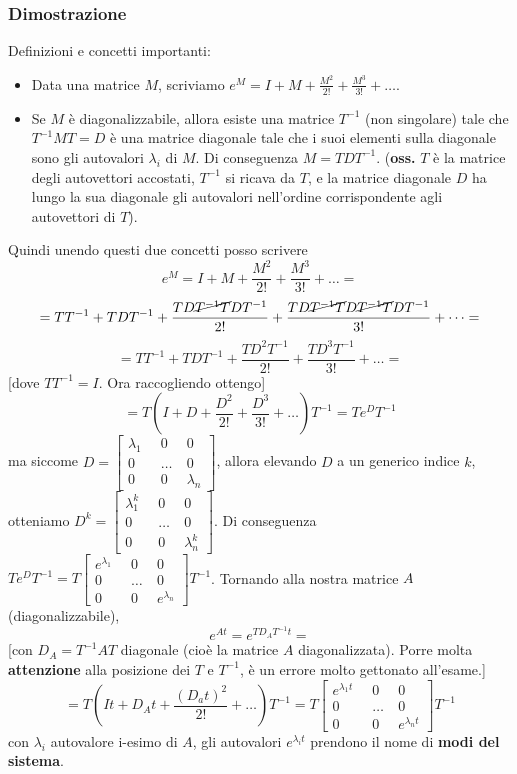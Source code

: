 \subsubsection{Dimostrazione}
Definizioni e concetti importanti:
\begin{itemize}
    \item Data una matrice $M$, scriviamo $e^M = I + M + \frac{M^2}{2!} + \frac{M^3}{3!}+\dots$.
    \item Se $M$ è diagonalizzabile, allora esiste una matrice $T^{-1}$ (non singolare) tale che $T^{-1} M T = D$ è una matrice diagonale tale che i suoi elementi sulla diagonale sono gli autovalori $\lambda_i$ di $M$. Di conseguenza $M = T D T^{-1}$.\newline
    (\textbf{oss.} $T$ è la matrice degli autovettori accostati, $T^{-1}$ si ricava da $T$, e la matrice diagonale $D$ ha lungo la sua diagonale gli autovalori nell'ordine corrispondente agli autovettori di $T$).
\end{itemize}
Quindi unendo questi due concetti posso scrivere
\[
    e^M = I + M + \frac{M^2}{2!} + \frac{M^3}{3!}+\dots=
\]
\[
    = TT^{-1} + T D T^{-1} + \frac{TD\cancel{T^{-1} T}DT^{-1}}{2!} + \frac{TD \cancel{T^{-1} T}D \cancel{T^{-1} T}DT^{-1}}{3!} + \dots =
\]
\[
    = TT^{-1} + T D T^{-1} + \frac{TD^2T^{-1}}{2!} + \frac{TD^3T^{-1}}{3!} + \dots=
\]
[dove $TT^{-1} = I$. Ora raccogliendo ottengo]
\[
    = T(I + D + \frac{D^2}{2!} + \frac{D^3}{3!} + \dots)T^{-1} = T e^{D}T^{-1}
\]
ma siccome $D = \left[\begin{matrix}
    \lambda_1 \;\; &0 \;\; &0\\
    0 & \dots &0\\
    0 &0 & \lambda_n
\end{matrix}\right]$, allora elevando $D$ a un generico indice $k$, otteniamo $D^k= \left[\begin{matrix}
    \lambda_1^k \;\; &0 \;\; &0\\
    0 & \dots &0\\
    0 &0 & \lambda_n^k
\end{matrix}\right]$.\newline
Di conseguenza $T e^{D}T^{-1} = T \left[\begin{matrix}
    e^{\lambda_1} \;\; &0 \;\; &0\\
    0 & \dots &0\\
    0 &0 & e^{\lambda_n}
\end{matrix}\right] T^{-1}$.\newline
Tornando alla nostra matrice $A$ (diagonalizzabile), 
\[
    e^{At}= e^{TD_AT^{-1}t} =
\] 
[con $D_A = T^{-1} A T$ diagonale (cioè la matrice $A$ diagonalizzata). Porre molta \textbf{attenzione} alla posizione dei $T$ e $T^{-1}$, è un errore molto gettonato all'esame.]
\[
    = T(It + D_A t + \frac{(D_at)^2}{2!} + \dots)T^{-1} =  T \left[\begin{matrix}
        e^{\lambda_1t} \;\; &0 \;\; &0\\
        0 & \dots &0\\
        0 &0 & e^{\lambda_nt}
    \end{matrix}\right]T^{-1}
\] con $\lambda_i$ autovalore i-esimo di $A$, gli autovalori $e^{\lambda_it}$ prendono il nome di \textbf{modi del sistema}.
